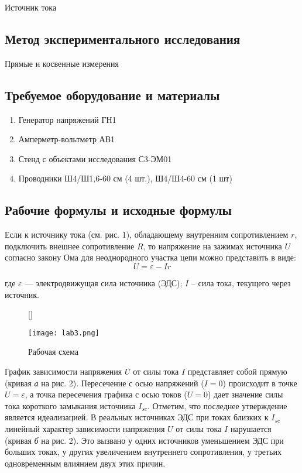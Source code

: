 \documentclass[12pt, a4paper]{article}
\begin{document}
Источник тока

\subsection*{Метод экспериментального исследования}

Прямые и косвенные измерения

\subsection*{Требуемое оборудование и материалы}

\begin{enumerate}
\item Генератор напряжений ГН1
\item Амперметр-вольтметр АВ1
\item Стенд с объектами исследования С3-ЭМ01
\item Проводники Ш4/Ш1,6-60 см (4 шт.), Ш4/Ш4-60 см (1 шт)
\end{enumerate}

\subsection*{Рабочие формулы и исходные формулы}

Если к источнику тока (см. рис. 1), обладающему внутренним
сопротивлением $r$, подключить внешнее сопротивление $R$, то напряжение на
зажимах источника $U$ согласно закону Ома для неоднородного участка цепи
можно представить в виде:
\begin{equation}
U = \varepsilon - Ir
\end{equation}

где $\varepsilon$ — электродвижущая сила источника (ЭДС); $I$ – сила тока,
текущего через источник.

\begin{figure}[H]
[\FBwidth]
{\caption{Рабочая схема}}
{\texttt{[image: lab3.png]}}
\end{figure}

График зависимости напряжения $U$ от силы тока $I$ представляет собой прямую
(кривая \textit{а} на рис. 2). Пересечение с осью напряжений ($I = 0$)
происходит в точке $U = \varepsilon$, а точка пересечения графика с осью токов
($U = 0$) дает значение силы тока короткого замыкания источника $I_{sc}$.
Отметим, что последнее утверждение является идеализацией. В реальных источниках
ЭДС при токах близких к $I_{sc}$ линейный характер зависимости
напряжения $U$ от силы тока $I$ нарушается (кривая \textit{б} на рис. 2).
Это вызвано у одних источников уменьшением ЭДС при больших токах, у других
увеличением внутреннего сопротивления, у третьих одновременным влиянием двух этих причин.
\end{document}

